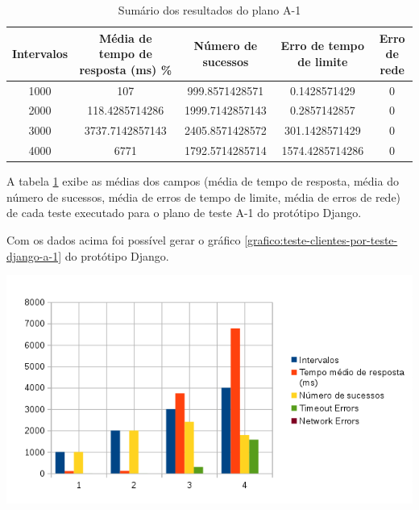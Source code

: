    
  \begin{table}[H]
    \centering
    \footnotesize
    \setlength{\abovecaptionskip}{0pt}
    \setlength{\belowcaptionskip}{0pt}
    \caption[Sumário dos resultados do plano A-1]{Sumário dos resultados do plano A-1	}
    \label{tab:sumario-resultado-plano-teste-a-1}
    \begin{tabular}{c|c|c|c|c}
      \hline \hline
      Intervalos  & 	Média de tempo de resposta (ms) \% &	Número de sucessos & 	Erro de tempo de limite &	Erro de rede \\ 
      \hline \hline
      1000 &		107 &					999.8571428571 & 		0.1428571429 &			0 \\
      2000 &		118.4285714286 &			1999.7142857143 & 		0.2857142857  &			0 \\
      3000 &		3737.7142857143 &			2405.8571428572 & 		301.1428571429 &		0 \\
      4000 &		6771 &					1792.5714285714 & 		1574.4285714286 &		0 \\
      \hline \hline
    \end{tabular}
  \end{table}
  
  A tabela \ref{tab:sumario-resultado-plano-teste-a-1} exibe as médias dos campos (média de tempo de resposta, 
  média do número de sucessos, média de erros de tempo de limite, média de erros de rede) de cada teste executado 
  para o plano de teste A-1 do protótipo Django.
  
  Com os dados acima foi possível gerar o gráfico \ref{grafico:teste-clientes-por-teste-django-a-1} do 
  protótipo Django.
  
  \begin{grafico}[H]
    \setlength{\abovecaptionskip}{5pt}
    \setlength{\belowcaptionskip}{0pt}
    \label{grafico:teste-clientes-por-teste-django-a-1}
    \caption[Clientes por teste no Django]
	    {Clientes por teste no Django}
    \centering
    \includegraphics[width=.80\textwidth]{imagem/graficos/grafico_django_plano_de_teste_1.png}
    \captionsetup[grafico]{justification=centering}
  \end{grafico}
  
